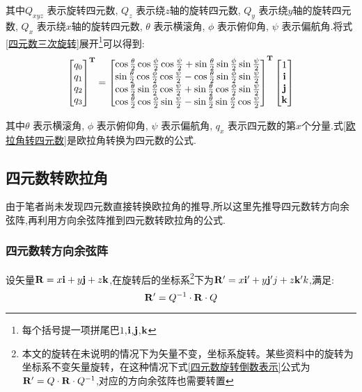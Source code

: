 其中$Q_{xyz}$   表示旋转四元数,
$Q_{z}$         表示绕$z$轴的旋转四元数,
$Q_{y}$         表示绕$y$轴的旋转四元数,
$Q_{x}$         表示绕$x$轴的旋转四元数,
$\theta$        表示横滚角,
$\phi$          表示俯仰角,
$\psi$          表示偏航角.将式\ref{四元数三次旋转}展开\footnote{每个括号提一项拼尾巴$1$,$\mathbf{i}$,$\mathbf{j}$,$\mathbf{k}$}可以得到:
\begin{equation}\label{欧拉角转四元数}
    \begin{split}
        \left[\begin{matrix}
                q_0 \\
                q_1 \\
                q_2 \\
                q_3
        \end{matrix}\right]^\mathbf{T}
        =
        \left[\begin{matrix}
                \cos\frac{\theta}{2}\cos\frac{\phi}{2}\cos\frac{\psi}{2} + \sin\frac{\theta}{2}\sin\frac{\phi}{2}\sin\frac{\psi}{2} \\
                \sin\frac{\theta}{2}\cos\frac{\phi}{2}\cos\frac{\psi}{2} - \cos\frac{\theta}{2}\sin\frac{\phi}{2}\sin\frac{\psi}{2} \\
                \cos\frac{\theta}{2}\sin\frac{\phi}{2}\cos\frac{\psi}{2} + \sin\frac{\theta}{2}\cos\frac{\phi}{2}\sin\frac{\psi}{2} \\
                \cos\frac{\theta}{2}\cos\frac{\phi}{2}\sin\frac{\psi}{2} - \sin\frac{\theta}{2}\sin\frac{\phi}{2}\cos\frac{\psi}{2}
        \end{matrix}\right]^\mathbf{T}
        \left[\begin{matrix}
                1 \\
                \mathbf{i} \\
                \mathbf{j} \\
                \mathbf{k} \\
        \end{matrix}\right]
    \end{split}
\end{equation} 

其中$\theta$    表示横滚角,
$\phi$          表示俯仰角,
$\psi$          表示偏航角,
$q_x$           表示四元数的第$x$个分量.式\ref{欧拉角转四元数}是欧拉角转换为四元数的公式.

\subsection{四元数转欧拉角}
由于笔者尚未发现四元数直接转换欧拉角的推导,所以这里先推导四元数转方向余弦阵,再利用方向余弦阵推到四元数转欧拉角的公式.
\subsubsection{四元数转方向余弦阵}
设矢量$\mathbf{R}=x\mathbf{i}+y\mathbf{j}+z\mathbf{k}$,在\textcolor[rgb]{1,0,0}{旋转后的坐标系}\footnote{本文的旋转在未说明的情况下为矢量不变，坐标系旋转。某些资料中的旋转为坐标系不变矢量旋转，在这种情况下式\ref{四元数旋转倒数表示}公式为$\mathbf{R}' = Q \cdot \mathbf{R} \cdot Q^{-1}$,对应的方向余弦阵也需要转置\cite{惯性技术}}下为$\mathbf{R}'=x\mathbf{i}'+y\mathbf{j}'{j}+z\mathbf{k}'{k}$,满足:
\begin{equation}\label{四元数旋转倒数表示}
    \mathbf{R}'=Q^{-1} \cdot \mathbf{R} \cdot Q
\end{equation} 


